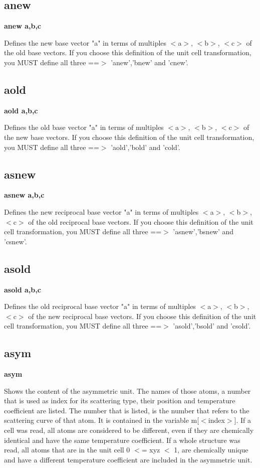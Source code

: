 \subsection*{anew}
{\bf anew a,b,c \par }
\par
\vspace{3pt}
Defines the new base vector "a" in terms of multiples $ <$a$> $, $ <$b$> $, $ <$c$> $ of 
the old base vectors. 
If you choose this definition of the unit cell transformation, you MUST 
define all three ==$> $ 'anew','bnew' and 'cnew'. 
\subsection*{aold}
{\bf aold a,b,c \par }
\par
\vspace{3pt}
Defines the old base vector "a" in terms of multiples $ <$a$> $, $ <$b$> $, $ <$c$> $ of 
the new base vectors. 
If you choose this definition of the unit cell transformation, you MUST 
define all three ==$> $ 'aold','bold' and 'cold'. 
\subsection*{asnew}
{\bf asnew a,b,c \par }
\par
\vspace{3pt}
Defines the new reciprocal base vector "a" in terms of 
multiples $ <$a$> $, $ <$b$> $, $ <$c$> $ of the old reciprocal base vectors. 
If you choose this definition of the unit cell transformation, you MUST 
define all three ==$> $ 'asnew','bsnew' and 'csnew'. 
\subsection*{asold}
{\bf asold a,b,c \par }
\par
\vspace{3pt}
Defines the old reciprocal base vector "a" in terms of 
multiples $ <$a$> $, $ <$b$> $, $ <$c$> $ of the new reciprocal base vectors. 
If you choose this definition of the unit cell transformation, you MUST 
define all three ==$> $ 'asold','bsold' and 'csold'. 
\subsection*{asym}
{\bf asym \par }
\par
\vspace{3pt}
Shows the content of the asymmetric unit. The names of those atoms, 
a number that is used as index for its scattering type, their position 
and temperature coefficient are listed. The number that is listed, 
is the number that refers to the scattering curve of that atom. It is 
contained in the variable m[$ <$index$> $]. If a cell was read, all atoms 
are considered to be different, even if they are chemically identical 
and have the same temperature coefficient. If a whole structure was 
read, all atoms that are in the unit cell 0 $ <$= xyz $ <$ 1, are chemically 
unique and have a different temperature coefficient are included in 
the asymmetric unit. 
